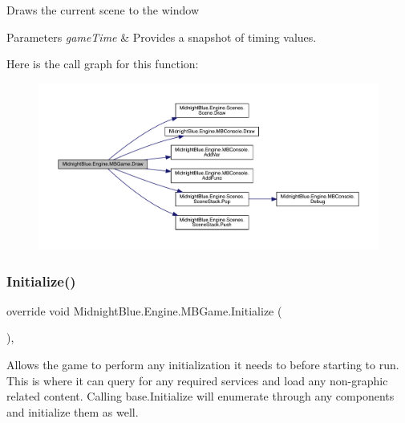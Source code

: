 Draws the current scene to the window 


\begin{DoxyParams}{Parameters}
{\em game\+Time} & Provides a snapshot of timing values.\\
\hline
\end{DoxyParams}
Here is the call graph for this function\+:
\nopagebreak
\begin{figure}[H]
\begin{center}
\leavevmode
\includegraphics[width=350pt]{class_midnight_blue_1_1_engine_1_1_m_b_game_a28dd0bac108b77fe04164ff81acf9881_cgraph}
\end{center}
\end{figure}
\hypertarget{class_midnight_blue_1_1_engine_1_1_m_b_game_a0e02fa538b3344104374f61a058516f8}{}\label{class_midnight_blue_1_1_engine_1_1_m_b_game_a0e02fa538b3344104374f61a058516f8} 
\subsubsection{\texorpdfstring{Initialize()}{Initialize()}}
{\footnotesize\ttfamily override void Midnight\+Blue.\+Engine.\+M\+B\+Game.\+Initialize (\begin{DoxyParamCaption}{ }\end{DoxyParamCaption})\hspace{0.3cm}{\ttfamily [inline]}, {\ttfamily [protected]}}



Allows the game to perform any initialization it needs to before starting to run. This is where it can query for any required services and load any non-\/graphic related content. Calling base.\+Initialize will enumerate through any components and initialize them as well. 

